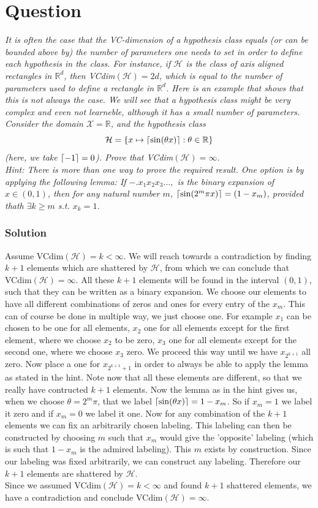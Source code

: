 \documentclass{article}
\DeclarePairedDelimiter\ceil{\lceil}{\rceil}
\newcounter{counterquestion}
\newenvironment{question}[1]
{
\stepcounter{counterquestion}
\section*{Question \thecounterquestion}
\emph{#1} 
} 
{
}
\newenvironment{solution}
{
\subsubsection*{Solution}
} 
{
}
\begin{document}
\begin{question}{It is often the case that the VC-dimension of a hypothesis class equals (or can be bounded above by) the number of parameters one needs to set in order to define each hypothesis in the class. For instance, if $\mathcal{H}$ is the class of axis aligned rectangles in $\mathbb{R}^d$, then VCdim$(\mathcal{H})=2d$, which is equal to the number of parameters used to define a rectangle in $\mathbb{R}^d$. Here is an example that shows that this is not always the case. We will see that a hypothesis class might be very complex and even not learneble, although it has a small number of parameters.\\
Consider the domain $\mathcal{X}=\mathbb{R}$, and the hypothesis class $$\mathcal{H}= \{ x\mapsto \ceil{\sin (\theta x) }:\theta \in \mathbb{R} \}$$
(here, we take $\ceil{-1}=0$). Prove that VCdim$(\mathcal{H})=\infty$.\\
\textit{Hint:} There is more than one way to prove the required result. One option is by applying the following lemma: If $-.x_1x_2x_3\dots ,$ is the binary expansion of $x\in (0,1)$, then for any natural number $m$, $\ceil{\sin (2^m \pi x)}=(1-x_m)$, provided thath $\exists k \geq m$ s.t. $x_k=1$.}
\begin{solution}
Assume VCdim$(\mathcal{H})=k<\infty$. We will reach towards a contradiction by finding $k+1$ elements which are shattered by $\mathcal{H}$, from which we can conclude that VCdim$(\mathcal{H})=\infty$. All these $k+1$ elements will be found in the interval $(0,1)$, such that they can be written as a binary expansion. We choose our elements to have all different combinations of zeros and ones for every entry of the $x_m$. This can of course be done in multiple way, we just choose one. For example $x_1$ can be chosen to be one for all elements, $x_2$ one for all elements except for the first element, where we choose $x_2$ to be zero, $x_3$ one for all elements except for the second one, where we choose $x_3$ zero. We proceed this way until we have $x_{2^{k+1}}$ all zero. Now place a one for $x_{2^{k+1}+1}$ in order to always be able to apply the lemma as stated in the hint. Note now that all these elements are different, so that we really have contructed $k+1$ elements. Now the lemma as in the hint gives us, when we choose $\theta=2^m\pi$, that we label $\ceil{\sin (\theta x)}=1-x_m$. So if $x_m=1$ we label it zero and if $x_m=0$ we label it one. Now for any combination of the $k+1$ elements we can fix an arbitrarily chosen labeling. This labeling can then be constructed by choosing $m$ such that $x_m$ would give the 'opposite' labeling (which is such that $1-x_m$ is the admired labeling). This $m$ exists by construction. Since our labeling was fixed arbitrarily, we can construct any labeling. Therefore our $k+1$ elements are shattered by $\mathcal{H}$.\\
Since we assumed VCdim$(\mathcal{H})=k<\infty$ and found $k+1$ shattered elements, we have a contradiction and conclude VCdim$(\mathcal{H})=\infty$.
\end{solution}
\end{question}
\end{document}
